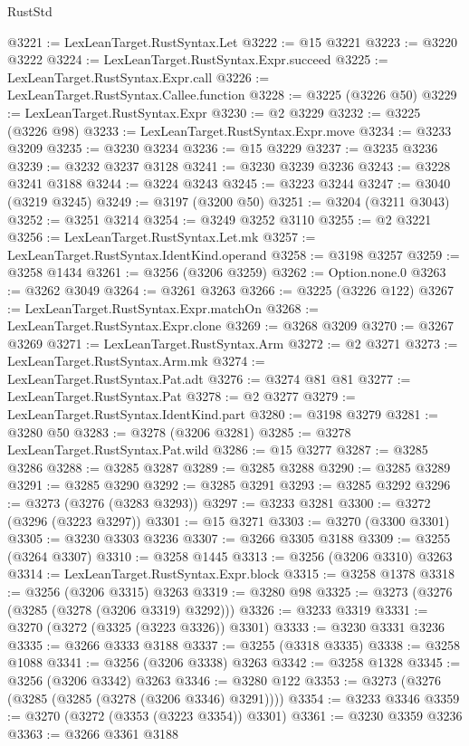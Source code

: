 \begin{lexlean}{RustStd}
\begin{coremodule}
{\begin{coremodule}
{{{{{{{{{{{{{{{{{{{{{{{{{{{{{{{{{{{{{@3221 := LexLeanTarget.RustSyntax.Let
@3222 := @15 @3221
@3223 := @3220 @3222
@3224 := LexLeanTarget.RustSyntax.Expr.succeed
@3225 := LexLeanTarget.RustSyntax.Expr.call
@3226 := LexLeanTarget.RustSyntax.Callee.function
@3228 := @3225 (@3226 @50)
@3229 := LexLeanTarget.RustSyntax.Expr
@3230 := @2 @3229
@3232 := @3225 (@3226 @98)
@3233 := LexLeanTarget.RustSyntax.Expr.move
@3234 := @3233 @3209
@3235 := @3230 @3234
@3236 := @15 @3229
@3237 := @3235 @3236
@3239 := @3232 @3237 @3128
@3241 := @3230 @3239 @3236
@3243 := @3228 @3241 @3188
@3244 := @3224 @3243
@3245 := @3223 @3244
@3247 := @3040 (@3219 @3245)
@3249 := @3197 (@3200 @50)
@3251 := @3204 (@3211 @3043)
@3252 := @3251 @3214
@3254 := @3249 @3252 @3110
@3255 := @2 @3221
@3256 := LexLeanTarget.RustSyntax.Let.mk
@3257 := LexLeanTarget.RustSyntax.IdentKind.operand
@3258 := @3198 @3257
@3259 := @3258 @1434
@3261 := @3256 (@3206 @3259)
@3262 := Option.none.{0}
@3263 := @3262 @3049
@3264 := @3261 @3263
@3266 := @3225 (@3226 @122)
@3267 := LexLeanTarget.RustSyntax.Expr.matchOn
@3268 := LexLeanTarget.RustSyntax.Expr.clone
@3269 := @3268 @3209
@3270 := @3267 @3269
@3271 := LexLeanTarget.RustSyntax.Arm
@3272 := @2 @3271
@3273 := LexLeanTarget.RustSyntax.Arm.mk
@3274 := LexLeanTarget.RustSyntax.Pat.adt
@3276 := @3274 @81 @81
@3277 := LexLeanTarget.RustSyntax.Pat
@3278 := @2 @3277
@3279 := LexLeanTarget.RustSyntax.IdentKind.part
@3280 := @3198 @3279
@3281 := @3280 @50
@3283 := @3278 (@3206 @3281)
@3285 := @3278 LexLeanTarget.RustSyntax.Pat.wild
@3286 := @15 @3277
@3287 := @3285 @3286
@3288 := @3285 @3287
@3289 := @3285 @3288
@3290 := @3285 @3289
@3291 := @3285 @3290
@3292 := @3285 @3291
@3293 := @3285 @3292
@3296 := @3273 (@3276 (@3283 @3293))
@3297 := @3233 @3281
@3300 := @3272 (@3296 (@3223 @3297))
@3301 := @15 @3271
@3303 := @3270 (@3300 @3301)
@3305 := @3230 @3303 @3236
@3307 := @3266 @3305 @3188
@3309 := @3255 (@3264 @3307)
@3310 := @3258 @1445
@3313 := @3256 (@3206 @3310) @3263
@3314 := LexLeanTarget.RustSyntax.Expr.block
@3315 := @3258 @1378
@3318 := @3256 (@3206 @3315) @3263
@3319 := @3280 @98
@3325 := @3273 (@3276 (@3285 (@3278 (@3206 @3319) @3292)))
@3326 := @3233 @3319
@3331 := @3270 (@3272 (@3325 (@3223 @3326)) @3301)
@3333 := @3230 @3331 @3236
@3335 := @3266 @3333 @3188
@3337 := @3255 (@3318 @3335)
@3338 := @3258 @1088
@3341 := @3256 (@3206 @3338) @3263
@3342 := @3258 @1328
@3345 := @3256 (@3206 @3342) @3263
@3346 := @3280 @122
@3353 := @3273 (@3276 (@3285 (@3285 (@3278 (@3206 @3346) @3291))))
@3354 := @3233 @3346
@3359 := @3270 (@3272 (@3353 (@3223 @3354)) @3301)
@3361 := @3230 @3359 @3236
@3363 := @3266 @3361 @3188
}}}}}}}}}}}}}}}}}}}}}}}}}}}}}}}}}}}}}
\end{coremodule}}
\end{coremodule}
\end{lexlean}
